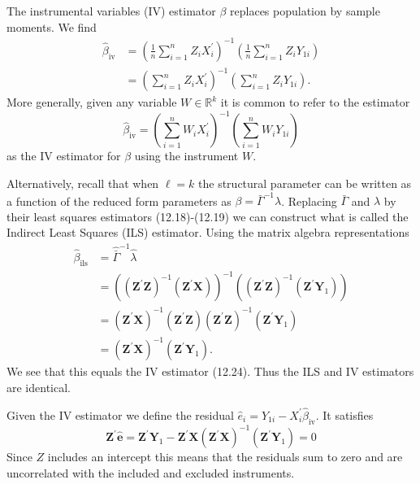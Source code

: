 \documentclass[10pt]{article}
\begin{document}
The instrumental variables (IV) estimator $\beta$ replaces population by sample moments. We find
$$
\begin{aligned}
\widehat{\beta}_{\mathrm{iv}} &=\left(\frac{1}{n} \sum_{i=1}^{n} Z_{i} X_{i}^{\prime}\right)^{-1}\left(\frac{1}{n} \sum_{i=1}^{n} Z_{i} Y_{1 i}\right) \\
&=\left(\sum_{i=1}^{n} Z_{i} X_{i}^{\prime}\right)^{-1}\left(\sum_{i=1}^{n} Z_{i} Y_{1 i}\right) .
\end{aligned}
$$
More generally, given any variable $W \in \mathbb{R}^{k}$ it is common to refer to the estimator
$$
\widehat{\beta}_{\mathrm{iv}}=\left(\sum_{i=1}^{n} W_{i} X_{i}^{\prime}\right)^{-1}\left(\sum_{i=1}^{n} W_{i} Y_{1 i}\right)
$$
as the IV estimator for $\beta$ using the instrument $W$.

Alternatively, recall that when $\ell=k$ the structural parameter can be written as a function of the reduced form parameters as $\beta=\bar{\Gamma}^{-1} \lambda$. Replacing $\bar{\Gamma}$ and $\lambda$ by their least squares estimators (12.18)-(12.19) we can construct what is called the Indirect Least Squares (ILS) estimator. Using the matrix algebra representations
$$
\begin{aligned}
\widehat{\beta}_{\mathrm{ils}} &=\widehat{\bar{\Gamma}}^{-1} \widehat{\lambda} \\
&=\left(\left(\boldsymbol{Z}^{\prime} \boldsymbol{Z}\right)^{-1}\left(\boldsymbol{Z}^{\prime} \boldsymbol{X}\right)\right)^{-1}\left(\left(\boldsymbol{Z}^{\prime} \boldsymbol{Z}\right)^{-1}\left(\boldsymbol{Z}^{\prime} \boldsymbol{Y}_{1}\right)\right) \\
&=\left(\boldsymbol{Z}^{\prime} \boldsymbol{X}\right)^{-1}\left(\boldsymbol{Z}^{\prime} \boldsymbol{Z}\right)\left(\boldsymbol{Z}^{\prime} \boldsymbol{Z}\right)^{-1}\left(\boldsymbol{Z}^{\prime} \boldsymbol{Y}_{1}\right) \\
&=\left(\boldsymbol{Z}^{\prime} \boldsymbol{X}\right)^{-1}\left(\boldsymbol{Z}^{\prime} \boldsymbol{Y}_{1}\right) .
\end{aligned}
$$
We see that this equals the IV estimator (12.24). Thus the ILS and IV estimators are identical.

Given the IV estimator we define the residual $\widehat{e}_{i}=Y_{1 i}-X_{i}^{\prime} \widehat{\beta}_{\mathrm{iv}}$. It satisfies
$$
\boldsymbol{Z}^{\prime} \widehat{\boldsymbol{e}}=\boldsymbol{Z}^{\prime} \boldsymbol{Y}_{1}-\boldsymbol{Z}^{\prime} \boldsymbol{X}\left(\boldsymbol{Z}^{\prime} \boldsymbol{X}\right)^{-1}\left(\boldsymbol{Z}^{\prime} \boldsymbol{Y}_{1}\right)=0
$$
Since $Z$ includes an intercept this means that the residuals sum to zero and are uncorrelated with the included and excluded instruments.
\end{document}
